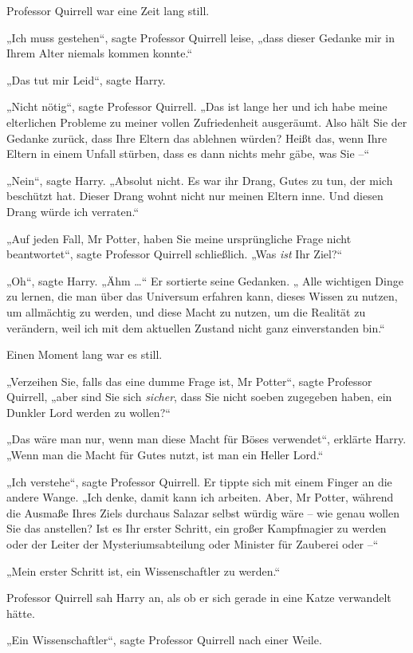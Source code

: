 {Professor Quirrell war eine Zeit lang still.

„Ich muss gestehen“, sagte Professor Quirrell leise, „dass dieser Gedanke mir in Ihrem Alter niemals kommen konnte.“

„Das tut mir Leid“, sagte Harry.

„Nicht nötig“, sagte Professor Quirrell. „Das ist lange her und ich habe meine elterlichen Probleme zu meiner vollen Zufriedenheit ausgeräumt. Also hält Sie der Gedanke zurück, dass Ihre Eltern das ablehnen würden? Heißt das, wenn Ihre Eltern in einem Unfall stürben, dass es dann nichts mehr gäbe, was Sie --“

„Nein“, sagte Harry. „Absolut nicht. Es war ihr Drang, Gutes zu tun, der mich beschützt hat. Dieser Drang wohnt nicht nur meinen Eltern inne. Und diesen Drang würde ich verraten.“

„Auf jeden Fall, Mr Potter, haben Sie meine ursprüngliche Frage nicht beantwortet“, sagte Professor Quirrell schließlich. „Was \emph{ist} Ihr Ziel?“

„Oh“, sagte Harry. „Ähm …“ Er sortierte seine Gedanken. „ Alle wichtigen Dinge zu lernen, die man über das Universum erfahren kann, dieses Wissen zu nutzen, um allmächtig zu werden, und diese Macht zu nutzen, um die Realität zu verändern, weil ich mit dem aktuellen Zustand nicht ganz einverstanden bin.“

Einen Moment lang war es still.

„Verzeihen Sie, falls das eine dumme Frage ist, Mr Potter“, sagte Professor Quirrell, „aber sind Sie sich \emph{sicher}, dass Sie nicht soeben zugegeben haben, ein Dunkler Lord werden zu wollen?“

„Das wäre man nur, wenn man diese Macht für Böses verwendet“, erklärte Harry. „Wenn man die Macht für Gutes nutzt, ist man ein Heller Lord.“

„Ich verstehe“, sagte Professor Quirrell. Er tippte sich mit einem Finger an die andere Wange. „Ich denke, damit kann ich arbeiten. Aber, Mr Potter, während die Ausmaße Ihres Ziels durchaus Salazar selbst würdig wäre -- wie genau wollen Sie das anstellen? Ist es Ihr erster Schritt, ein großer Kampfmagier zu werden oder der Leiter der Mysteriumsabteilung oder Minister für Zauberei oder --“

„Mein erster Schritt ist, ein Wissenschaftler zu werden.“

Professor Quirrell sah Harry an, als ob er sich gerade in eine Katze verwandelt hätte.

„Ein Wissenschaftler“, sagte Professor Quirrell nach einer Weile.

}
